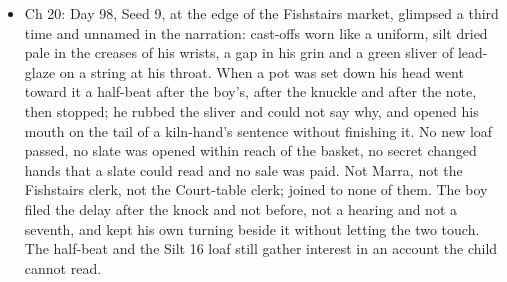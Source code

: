 \documentclass{design/chronicle}
\begin{document}
{\begin{itemize}[leftmargin=1.4em,itemsep=1pt,topsep=3pt,parsep=0pt]
\item Ch 20: Day 98, Seed 9, at the edge of the Fishstairs market, glimpsed a third time and unnamed in the narration: cast-offs worn like a uniform, silt dried pale in the creases of his wrists, a gap in his grin and a green sliver of lead-glaze on a string at his throat. When a pot was set down his head went toward it a half-beat after the boy’s, after the knuckle and after the note, then stopped; he rubbed the sliver and could not say why, and opened his mouth on the tail of a kiln-hand’s sentence without finishing it. No new loaf passed, no slate was opened within reach of the basket, no secret changed hands that a slate could read and no sale was paid. Not Marra, not the Fishstairs clerk, not the Court-table clerk; joined to none of them. The boy filed the delay after the knock and not before, not a hearing and not a seventh, and kept his own turning beside it without letting the two touch. The half-beat and the Silt 16 loaf still gather interest in an account the child cannot read.

\end{itemize}
}
\end{document}
